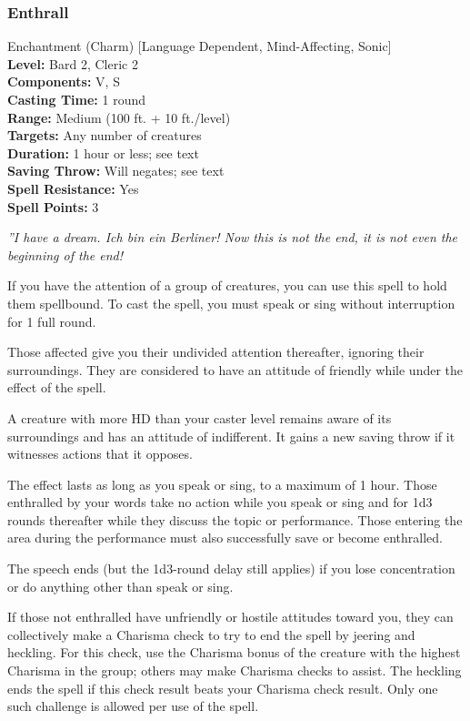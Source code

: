 \subsubsection{Enthrall}
\label{Spell:Enthrall}
Enchantment (Charm) [Language Dependent, Mind-Affecting, Sonic]
\\ \textbf{Level:} Bard 2, Cleric 2
\\ \textbf{Components:} V, S
\\ \textbf{Casting Time:} 1 round
\\ \textbf{Range:} Medium (100 ft. + 10 ft./level)
\\ \textbf{Targets:} Any number of creatures
\\ \textbf{Duration:} 1 hour or less; see text
\\ \textbf{Saving Throw:} Will negates; see text
\\ \textbf{Spell Resistance:} Yes
\\ \textbf{Spell Points:} 3

\emph{''I have a dream. Ich bin ein Berliner! Now this is not the end, it is not even the beginning of the end!}

If you have the attention of a group of creatures, you can use this spell to hold them spellbound. To cast the spell, you must speak or sing without interruption for 1 full round. 

Those affected give you their undivided attention thereafter, ignoring their surroundings. They are considered to have an attitude of friendly while under the effect of the spell.

A creature with more HD than your caster level remains aware of its surroundings and has an attitude of indifferent. It gains a new saving throw if it witnesses actions that it opposes.

The effect lasts as long as you speak or sing, to a maximum of 1 hour. Those enthralled by your words take no action while you speak or sing and for 1d3 rounds thereafter while they discuss the topic or performance. Those entering the area during the performance must also successfully save or become enthralled. 

The speech ends (but the 1d3-round delay still applies) if you lose concentration or do anything other than speak or sing.

If those not enthralled have unfriendly or hostile attitudes toward you, they can collectively make a Charisma check to try to end the spell by jeering and heckling. For this check, use the Charisma bonus of the creature with the highest Charisma in the group; others may make Charisma checks to assist. The heckling ends the spell if this check result beats your Charisma check result. Only one such challenge is allowed per use of the spell.

